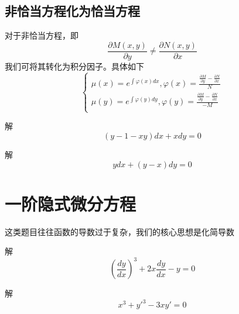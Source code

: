 \documentclass[lang=cn,14pt]{elegantbook}
\begin{document}
	\subsection{非恰当方程化为恰当方程}
	\begin{note}
		对于非恰当方程，即
		\begin{equation*}
			\frac{\partial M\left( x,y \right)}{\partial y}\ne\frac{\partial N\left( x,y \right)}{\partial x}
			\end{equation*}
			我们可将其转化为积分因子。具体如下
			\begin{equation*}
				\begin{cases}
					\mu \left( x \right) =e^{\int{\varphi \left( x \right) dx}},\varphi \left( x \right) =\frac{\frac{\partial M}{\partial y}-\frac{\partial N}{\partial x}}{N}\\
					\mu \left( y \right) =e^{\int{\varphi \left( y \right) dy}},\varphi \left( y \right) =\frac{\frac{\partial M}{\partial y}-\frac{\partial N}{\partial x}}{-M}\\
				\end{cases}
			\end{equation*}
	\end{note}
	\begin{example}
		解\begin{equation*}
				(y-1-xy)dx+xdy=0
		\end{equation*}
	\end{example}
	\vspace{2cm}
	\begin{example}
		解\begin{equation*}
			ydx+(y-x)dy=0
		\end{equation*}
	\end{example}
	\vspace{2cm}
	\section{一阶隐式微分方程}
	\begin{remark}
		这类题目往往函数的导数过于复杂，我们的核心思想是化简导数
	\end{remark}
		\begin{example}
		解\begin{equation*}
			\left( \frac{dy}{dx} \right) ^3+2x\frac{dy}{dx}-y=0
		\end{equation*}
	\end{example}
	\vspace{2cm}
		\begin{example}
		解\begin{equation*}
			x^3+y'^3-3xy'=0
		\end{equation*}
	\end{example}
	\vspace{2cm}
\end{document}
